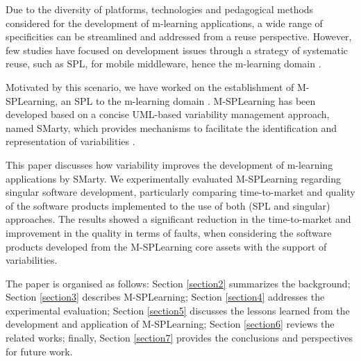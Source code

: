 Due to the diversity of platforms, technologies and pedagogical methods considered for the development of m-learning applications, a wide range of specificities can be streamlined and addressed from a reuse perspective. However, few studies have focused on development issues through a strategy of systematic reuse, such as SPL, for mobile middleware, hence the m-learning domain \cite{bezerra09}.

Motivated by this scenario, we have worked on the establishment of M-SPLear\allowbreak ning, an SPL to the m-learning domain \cite{falvojr14a,falvojr14b}. M-SPLear\allowbreak ning has been developed based on a concise UML-based variability management approach, named SMarty, which provides mechanisms to facilitate the identification and representation of variabilities \cite{oliveirajr10}.

This paper discusses how variability improves the development of m-learning applications by SMarty. We experimentally evaluated M-SPLear\allowbreak ning regarding singular software development, particularly comparing time-to-market and quality of the software products implemented to the use of both (SPL and singular) approaches. The results showed a significant reduction in the time-to-market and improvement in the quality in terms of faults, when considering the software products developed from the M-SPLear\allowbreak ning core assets with the support of variabilities.

The paper is organised as follows: Section \ref{section2} summarizes the background; Section \ref{section3} describes M-SPLear\allowbreak ning; Section \ref{section4} addresses the experimental evaluation; Section \ref{section5} discusses the lessons learned from the development and application of M-SPLear\allowbreak ning; Section \ref{section6} reviews the related works; finally, Section \ref{section7} provides the conclusions and perspectives for future work.
